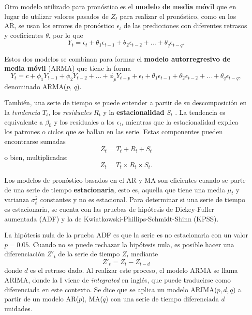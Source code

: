 \documentclass{elsarticle}
\begin{document}
Otro modelo utilizado para pronóstico es el \textbf{modelo de media móvil} que en lugar de utilizar valores pasados de $Z_t$ para realizar el pronóstico, como en los AR, se usan los errores de pronóstico $\epsilon_t$ de las predicciones con diferentes retrasos y coeficientes $\theta$, por lo que
\begin{equation}
    Y_{t} = \epsilon_t + \theta_{1} \epsilon_{t-1} + \theta_{2}\epsilon_{t-2} + \ldots + \theta_{q}\epsilon_{t-q}.
\end{equation}

Estos dos modelos se combinan para formar el \textbf{modelo autorregresivo de media móvil} (ARMA) que tiene la forma
\begin{equation}
    Y_t = c + \phi_1 Y_{t-1} + \phi_2 Y_{t-2} + \ldots + \phi_p Y_{t-p} + \epsilon_t + \theta_{1} \epsilon_{t-1} + \theta_{2}\epsilon_{t-2} + \ldots + \theta_{q}\epsilon_{t-q},
\end{equation}
denominado ARMA($p$, $q$).

También, una serie de tiempo se puede entender a partir de su descomposición en la \textit{tendencia} $T_t$, los \textit{residuales} $R_t$ y la \textbf{estacionalidad} $S_t$ \cite{Brockwell2002}. La tendencia es equivalente a $\beta_0$ y los residuales a los $\epsilon_t$, mientras que la estacionalidad explica los patrones o ciclos que se hallan en las serie. Estas componentes pueden encontrarse sumadas
\begin{equation}
    Z_t = T_t + R_t + S_t
\end{equation}
o bien, multiplicadas:
\begin{equation}
    Z_t = T_t \times R_t \times S_t.
\end{equation}

Los modelos de pronóstico basados en el AR y MA son eficientes cuando se parte de una serie de tiempo \textbf{estacionaria}, esto es, aquella que tiene una media $\mu_t$ y varianza $\sigma^2_t$ constantes y no es estacional. Para determinar si una serie de tiempo es estacionaria, se cuenta con las pruebas de hipótesis de Dickey-Fuller aumentada (ADF) y la de Kwiatkowski-Phillips-Schmidt-Shinn (KPSS). 

La hipótesis nula de la prueba ADF es que la serie es no estacionaria con un valor $p = 0.05$. Cuando no se puede rechazar la hipótesis nula, es posible hacer una diferenciación $Z'_t$ de la serie de tiempo $Z_t$ mediante
\begin{equation}
\label{diferenciacion}
    Z'_t = Z_t - Z_{t - d}
\end{equation}
donde $d$ es el retraso dado. Al realizar este proceso, el modelo ARMA se llama ARIMA, donde la I viene de \textit{integrated} en inglés, que puede traducirse como diferenciada en este contexto. Se dice que se aplica un modelo ARIMA($p, d, q$) a partir de un modelo AR($p$), MA($q$) con una serie de tiempo diferenciada $d$ unidades.
\end{document}
